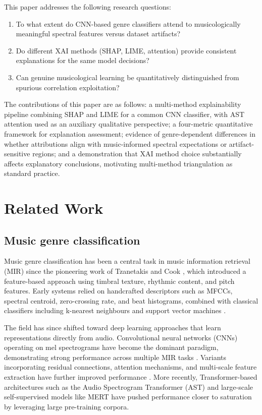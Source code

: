 \documentclass{article}
\begin{document}
This paper addresses the following research questions:

\begin{enumerate}
\item[\textbf{RQ1}:] To what extent do CNN-based genre classifiers attend to musicologically meaningful spectral features versus dataset artifacts?
\item[\textbf{RQ2}:] Do different XAI methods (SHAP, LIME, attention) provide consistent explanations for the same model decisions?
\item[\textbf{RQ3}:] Can genuine musicological learning be quantitatively distinguished from spurious correlation exploitation?
\end{enumerate}

The contributions of this paper are as follows:  a multi-method explainability pipeline combining SHAP and LIME for a common CNN classifier, with AST attention used as an auxiliary qualitative perspective;  a four-metric quantitative framework for explanation assessment; evidence of genre-dependent differences in whether attributions align with music-informed spectral expectations or artifact-sensitive regions; and a demonstration that XAI method choice substantially affects explanatory conclusions, motivating multi-method triangulation as standard practice.

\section{Related Work}\label{sec:related}

\subsection{Music genre classification}

Music genre classification has been a central task in music information retrieval (MIR) since the pioneering work of Tzanetakis and Cook \cite{Tzanetakis2002}, which introduced a feature-based approach using timbral texture, rhythmic content, and pitch features. Early systems relied on handcrafted descriptors such as MFCCs, spectral centroid, zero-crossing rate, and beat histograms, combined with classical classifiers including k-nearest neighbours and support vector machines \cite{Li2003}.

The field has since shifted toward deep learning approaches that learn representations directly from audio. Convolutional neural networks (CNNs) operating on mel spectrograms have become the dominant paradigm, demonstrating strong performance across multiple MIR tasks \cite{Dieleman2014, Choi2017}. Variants incorporating residual connections, attention mechanisms, and multi-scale feature extraction have further improved performance \cite{Palanisamy2020}. More recently, Transformer-based architectures such as the Audio Spectrogram Transformer (AST) \cite{Gong2021} and large-scale self-supervised models like MERT \cite{Li2024} have pushed performance closer to saturation by leveraging large pre-training corpora.
\end{document}
